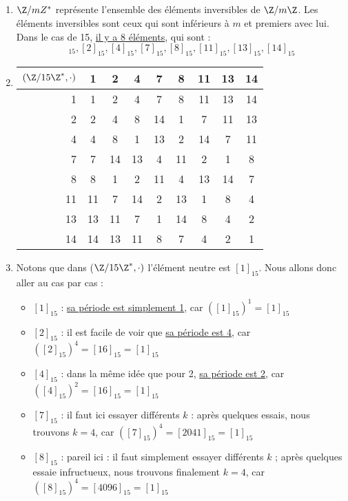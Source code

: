 \documentclass[10p,a4paper]{scrartcl}
\begin{document}
\subsection{}
\begin{enumerate}
	\item	$\Z/mZ^*$ représente l'ensemble des éléments inversibles de $\Z/m\Z$. Les éléments inversibles sont ceux qui sont inférieurs à $m$ et premiers avec lui. Dans le cas de 15, \uline{il y a 8 éléments}, qui sont :
			\begin{equation*}
				[1]_{15},[2]_{15},[4]_{15},[7]_{15},[8]_{15},[11]_{15},[13]_{15},[14]_{15}
			\end{equation*}
	\item	\begin{tabular}{r|cccccccc}
				$(\Z/15\Z^*,\cdot)$ & 1 & 2 & 4 & 7 & 8 & 11 & 13 & 14	\\			
				\hline
				1 & 1 & 2 & 4 & 7 & 8 & 11 & 13 & 14\\
				2 & 2 & 4 & 8 & 14 & 1 & 7 & 11 & 13\\
				4 & 4 & 8 & 1 & 13 & 2 & 14 & 7 & 11\\
				7 & 7 & 14 & 13 & 4 & 11 & 2 & 1 & 8\\
				8 & 8 & 1 & 2 & 11 & 4 & 13 & 14 & 7\\
				11 & 11 & 7 & 14 & 2 & 13 & 1 & 8 & 4\\
				13 & 13 & 11 & 7 & 1 & 14 & 8 & 4 & 2\\
				14 & 14 & 13 & 11 & 8 & 7 & 4 & 2 & 1
			\end{tabular}
	\item 	Notons que dans ($\Z/15\Z^*,\cdot)$ l'élément neutre est $[1]_{15}$. Nous allons donc aller au cas par cas :
			\begin{itemize}
				\item 	$[1]_{15}$ : \uline{sa période est simplement 1}, car $([1]_{15})^1 = [1]_{15}$
				\item 	$[2]_{15}$ : il est facile de voir que \uline{sa période est 4}, car $([2]_{15})^4 = [16]_{15} = [1]_{15}$
				\item 	$[4]_{15}$ : dans la même idée que pour 2, \uline{sa période est 2}, car $([4]_{15})^2 = [16]_{15} = [1]_{15}$
				\item	$[7]_{15}$ : il faut ici essayer différents $k$ : après quelques essais, nous trouvons \uline{$k = 4$}, car $([7]_{15})^4 = [2041]_{15} = [1]_{15}$ 
				\item	$[8]_{15}$ : pareil ici : il faut simplement essayer différents $k$ ; après quelques essaie infructueux, nous trouvons finalement \uline{$k = 4$}, car $([8]_{15})^4 = [4096]_{15} = [1]_{15}$

\end{itemize}
\end{enumerate}
\end{document}
